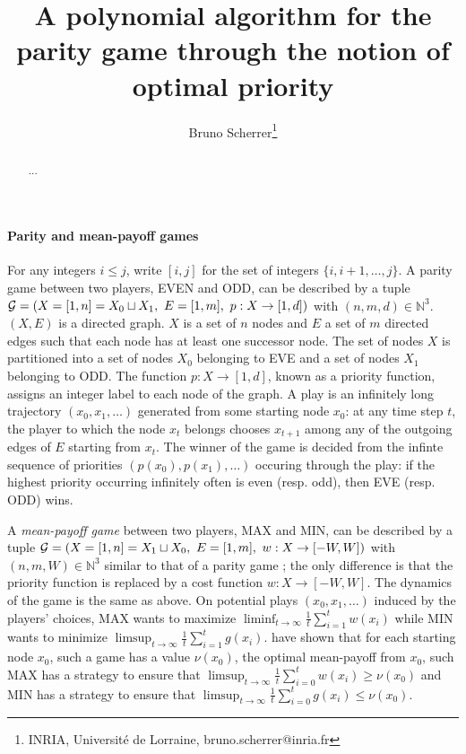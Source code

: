 \documentclass{article}
\title{A polynomial algorithm for the parity game through the notion of optimal priority}
\author{Bruno Scherrer\footnote{INRIA, Universit\'e de Lorraine, bruno.scherrer@inria.fr}}
\def\N{\mathbb N}
\def\G{{\cal G}}
\begin{document}
\maketitle

\begin{abstract}
  ...
\end{abstract}


\paragraph{Parity and mean-payoff games}
For any integers $i \le j$, write $[i,j]$ for the set of integers $\{i,i+1,\dots,j\}$.
A parity game between two players, EVEN and ODD, can be described by a tuple $\G=(X=[1,n]=X_0 \sqcup X_1,~ E=[1,m],~ p:X \to [1,d])$ with $(n,m,d) \in \N^3$.
$(X,E)$ is a directed graph. $X$ is a set of $n$ nodes and $E$ a set of $m$ directed edges such that each node has at least one successor node. 
The set of nodes  $X$ is partitioned into a set of nodes $X_0$ belonging to EVE and a set of nodes $X_1$ belonging to ODD. The function $p:X \to [1,d]$, known as a priority function, assigns an integer label to each node of the graph.
A play is an infinitely long trajectory $(x_0,x_1,\dots)$ generated from some starting node $x_0$: at any time step $t$, the player to which the node $x_t$ belongs chooses $x_{t+1}$ among any of the outgoing edges of $E$ starting from $x_t$. The winner of the game is decided from the infinte sequence of priorities $(p(x_0),p(x_1),\dots)$ occuring through the play: if the highest priority occurring infinitely often is even (resp. odd), then EVE (resp. ODD) wins.

A \emph{mean-payoff game} between two players, MAX and MIN, can be described by a tuple $\G=(X=[1,n]=X_1 \sqcup X_0,~ E=[1,m],~ w:X \to [-W,W])$ with $(n,m,W) \in \N^3$ similar to that of a parity game ; the only difference is that the priority function is replaced by a cost function $w:X \to [-W,W]$. The dynamics of the game is the same as above. On potential plays $(x_0,x_1,\dots)$ induced by the players' choices, MAX wants to maximize $\liminf_{t \to \infty}\frac{1}{t} \sum_{i=1}^t w(x_i)$ while MIN wants to minimize $\limsup_{t \to \infty}\frac{1}{t} \sum_{i=1}^t g(x_i)$. \citet{ehrenfeucht79} have shown that for each starting node $x_0$,  such a game has a value $\nu(x_0)$, the optimal mean-payoff from $x_0$, such MAX has a strategy to ensure that $\limsup_{t \to \infty}\frac{1}{t} \sum_{i=0}^t w(x_i) \ge \nu(x_0)$ and MIN has a strategy to ensure that $\limsup_{t \to \infty}\frac{1}{t} \sum_{i=0}^t g(x_i) \le \nu(x_0)$.
\end{document}
